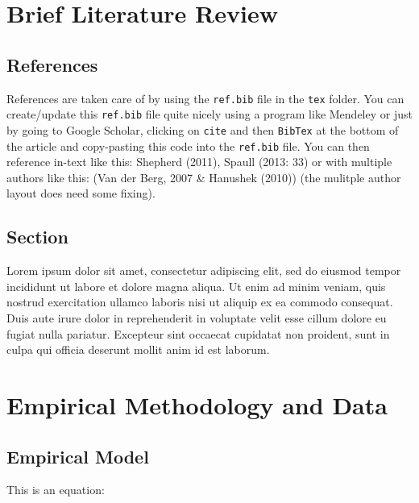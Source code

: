 \documentclass[12pt,preprint, authoryear]{article}
\numberwithin{equation}{section}
\numberwithin{figure}{section}
\numberwithin{table}{section}
\begin{document}
\section{\texorpdfstring{Brief Literature Review
\label{Lit}}{Brief Literature Review }}\label{brief-literature-review}

\subsection{References}\label{references}

References are taken care of by using the \texttt{ref.bib} file in the
\texttt{tex} folder. You can create/update this \texttt{ref.bib} file
quite nicely using a program like Mendeley or just by going to Google
Scholar, clicking on \texttt{cite} and then \texttt{BibTex} at the
bottom of the article and copy-pasting this code into the
\texttt{ref.bib} file. You can then reference in-text like this:
Shepherd (2011), Spaull (2013: 33) or with multiple authors like this:
(Van der Berg, 2007 \& Hanushek (2010)) (the mulitple author layout does
need some fixing).

\subsection{Section}\label{section}

Lorem ipsum dolor sit amet, consectetur adipiscing elit, sed do eiusmod
tempor incididunt ut labore et dolore magna aliqua. Ut enim ad minim
veniam, quis nostrud exercitation ullamco laboris nisi ut aliquip ex ea
commodo consequat. Duis aute irure dolor in reprehenderit in voluptate
velit esse cillum dolore eu fugiat nulla pariatur. Excepteur sint
occaecat cupidatat non proident, sunt in culpa qui officia deserunt
mollit anim id est laborum.

\section{\texorpdfstring{Empirical Methodology and Data
\label{Data}}{Empirical Methodology and Data }}\label{empirical-methodology-and-data}

\subsection{\texorpdfstring{Empirical Model
\label{Model}}{Empirical Model }}\label{empirical-model}

This is an equation:
\end{document}

